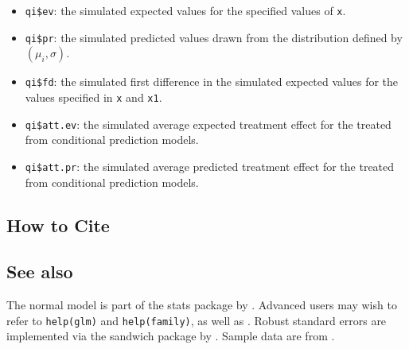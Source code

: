 \begin{itemize}
   \begin{itemize}
   \item {\tt qi\$ev}: the simulated expected values for the specified
     values of {\tt x}.
   \item {\tt qi\$pr}: the simulated predicted values drawn from the
     distribution defined by $(\mu_i, \sigma)$.
   \item {\tt qi\$fd}: the simulated first difference in the simulated
     expected values for the values specified in {\tt x} and {\tt x1}.
   \item {\tt qi\$att.ev}: the simulated average expected treatment
     effect for the treated from conditional prediction models.  
   \item {\tt qi\$att.pr}: the simulated average predicted treatment
     effect for the treated from conditional prediction models.  
   \end{itemize}
\end{itemize}

\subsection* {How to Cite} 




\subsection* {See also}

The normal model is part of the stats package by \citet{VenRip02}.
Advanced users may wish to refer to \texttt{help(glm)} and
\texttt{help(family)}, as well as \cite{McCNel89}. Robust standard
errors are implemented via the sandwich package by \citet{Zeileis04}.
Sample data are from \cite{KinTomWit00}.
